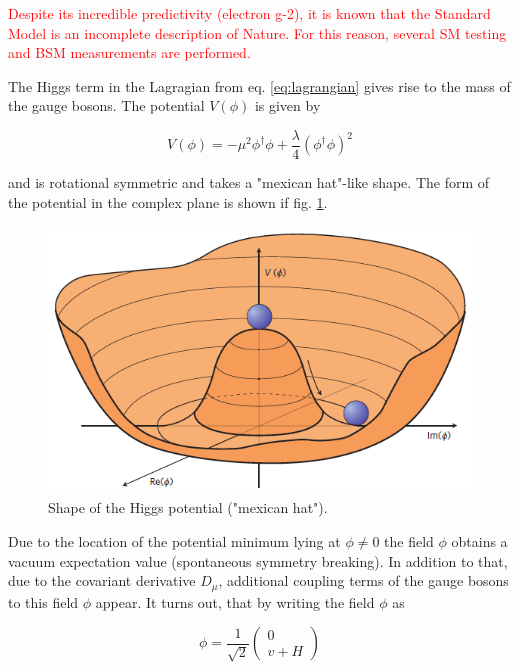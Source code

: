 \textcolor{red}{Despite its incredible predictivity (electron g-2), it is known that the Standard Model is an incomplete description of Nature. For this reason, several SM testing and BSM measurements are performed.}

The Higgs term in the Lagragian from eq. \ref{eq:lagrangian} gives rise to the mass of the gauge bosons. The potential $V(\phi)$ is given by

\begin{equation*}
	V(\phi) = -\mu^2 \phi^\dagger \phi + \frac{\lambda}{4}\left(\phi^\dagger\phi\right)^2 
\end{equation*}

and is rotational symmetric and takes a "mexican hat"-like shape. The form of the potential in the complex plane is shown if fig. \ref{fig:mexicanhat}.

\begin{figure}[h!]
	\centering
	\includegraphics[width=0.8\linewidth]{figures/theory/higgspotential}
	\caption{Shape of the Higgs potential ("mexican hat"). \cite{Ellis:2012465}}
	\label{fig:mexicanhat}
\end{figure}

Due to the location of the potential minimum lying at $\phi \neq 0$ the field $\phi$ obtains a vacuum expectation value (spontaneous symmetry breaking). In addition to that, due to the covariant derivative $D_\mu$, additional coupling terms of the gauge bosons to this field $\phi$ appear. It turns out, that by writing the field $\phi$ as

\begin{equation*}
	\phi = \frac{1}{\sqrt{2}}\left(\begin{matrix}
		0 \\
		v + H
	\end{matrix}
	\right)
\end{equation*}


